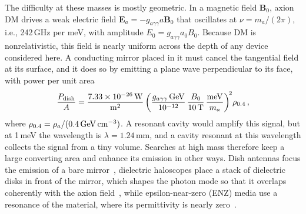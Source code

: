 \documentclass[
  aps,prl,reprint,superscriptaddress,
  amsmath,amssymb,floatfix,nofootinbib
]{revtex4-2}
\newcommand{\gagg}{g_{a\gamma\gamma}}
\begin{document}
The difficulty at these masses is mostly geometric. In a magnetic field $\mathbf B_0$, axion DM drives a weak electric field $\mathbf E_a=-\gagg a\mathbf B_0$ that oscillates at $\nu=m_a/(2\pi)$, i.e., 242\,GHz per meV, with amplitude $E_0=\gagg a_0B_0$. Because DM is nonrelativistic, this field is nearly uniform across the depth of any device considered here. A conducting mirror placed in it must cancel the tangential field at its surface, and it does so by emitting a plane wave perpendicular to its face, with power per unit area~\cite{Horns:2012jf}
\begin{equation}
\frac{P_{\rm dish}}{A}=\frac{7.33\times10^{-26}\,{\rm W}}{\rm m^2}\left(\frac{\gagg\,{\rm GeV}}{10^{-12}}\,\frac{B_0}{10\,{\rm T}}\,\frac{\rm meV}{m_a}\right)^{\!2}\!\rho_{0.4}\,,
\label{eq:dish}
\end{equation}
where $\rho_{0.4}=\rho_a/(0.4\,{\rm GeV\,cm^{-3}})$. A resonant cavity would amplify this signal, but at 1\,meV the wavelength is $\lambda=1.24\,$mm, and a cavity resonant at this wavelength collects the signal from a tiny volume. Searches at high mass therefore keep a large converting area and enhance its emission in other ways. Dish antennas focus the emission of a bare mirror~\cite{Horns:2012jf,BREAD:2021tpx}, dielectric haloscopes place a stack of dielectric disks in front of the mirror, which shapes the photon mode so that it overlaps coherently with the axion field~\cite{Caldwell:2016dcw,Millar:2016cjp,MADMAX:2019pub}, while epsilon-near-zero (ENZ) media use a resonance of the material, where its permittivity is nearly zero~\cite{Schutte-Engel:2021bqm,Marsh:2022fmo,Mehrani:2025ryc}.
\end{document}
